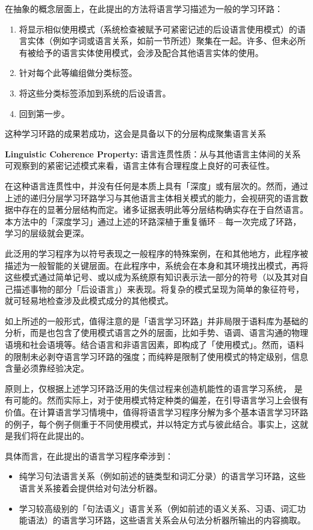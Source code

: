 在抽象的概念层面上，在此提出的方法将语言学习描述为一般的学习环路：

\begin{enumerate}
\item 将显示相似使用模式（系统检查被赋予可紧密记述的后设语言使用模式）的语言实体（例如字词或语言关系，如前一节所述）聚集在一起。许多、但未必所有被给予的语言实体使用模式，会涉及配合其他语言实体的使用。 
\item 针对每个此等编组做分类标签。 
\item 将这些分类标签添加到系统的后设语言。
\item 回到第一步。
\end{enumerate}

这种学习环路的成果若成功，这会是具备以下的分层构成聚集语言关系

\parbox[c]{10cm}{%
 \textbf{Linguistic Coherence Property:} 语言连贯性质：从与其他语言主体间的关系可观察到的紧密记述模式来看，语言主体有合理程度上良好的可表征性。%
}

在这种语言连贯性中，并没有任何是本质上具有「深度」或有层次的。然而，通过上述的递归分层学习环路学习与其他语言主体相关模式的能力，会视研究的语言数据中存在的显著分层结构而定。诸多证据表明此等分层结构确实存在于自然语言。本方法中的「深度学习」通过上述的环路深植于重复循环 – 每一次完成了环路，学习的层级就会更深。

此泛用的学习程序为以符号表现之一般程序的特殊案例，在\cite{Goertzel1994}和其他地方，此程序被描述为一般智能的关键层面。在此程序中，系统会在本身和其环境找出模式，再将这些模式通过简单记号、或以成为系统原有知识表示法一部分的符号（以及其对自己描述事物的部分「后设语言」）来表现。将复杂的模式呈现为简单的象征符号，就可轻易地检查涉及此模式成分的其他模式。

如上所述的一般形式，值得注意的是「语言学习环路」并非局限于语料库为基础的分析，而是也包含了使用模式语言之外的层面，比如手势、语调、语言沟通的物理语境和社会语境等。结合语言和非语言因素，即构成了「使用模式」。然而，语料的限制未必剥夺语言学习环路的强度；而纯粹是限制了使用模式的特定级别，信息含量必须靠经验决定。

原则上，仅根据上述学习环路泛用的失信过程来创造机能性的语言学习系统， 是有可能的。然而实际上，对于使用模式特定种类的偏差，在引导语言学习上会很有价值。在计算语言学习情境中，值得将语言学习程序分解为多个基本语言学习环路的例子，每个例子侧重于不同使用模式，并以特定方式与彼此结合。事实上，这就是我们将在此提出的。

具体而言，在此提出的语言学习程序牵涉到：

\begin{itemize}
\item 纯学习句法语言关系（例如前述的链类型和词汇分录）的语言学习环路，这些语言关系接着会提供给对句法分析器。 
\item 学习较高级别的「句法语义」语言关系（例如前述的语义关系、习语、词汇功能语法）的语言学习环路，这些语言关系会从句法分析器所输出的内容摘取。
\end{itemize}

